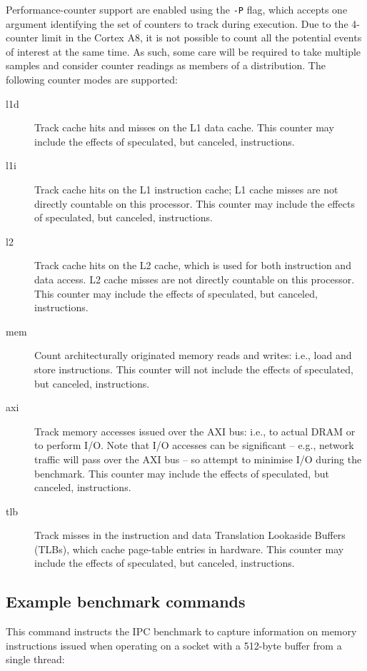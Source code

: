 \documentclass[a4paper,10pt]{article}
\begin{document}
Performance-counter support are enabled using the \texttt{-P} flag, which
accepts one argument identifying the set of counters to track during
execution.
Due to the 4-counter limit in the Cortex A8, it is not possible to count all
the potential events of interest at the same time.
As such, some care will be required to take multiple samples and consider
counter readings as members of a distribution.
The following counter modes are supported:

\begin{description}
\item[l1d] Track cache hits and misses on the L1 data cache.
  This counter may include the effects of speculated, but canceled,
  instructions.
\item[l1i] Track cache hits on the L1 instruction cache; L1 cache misses are
  not directly countable on this processor.
  This counter may include the effects of speculated, but canceled,
  instructions.
\item[l2] Track cache hits on the L2 cache, which is used for both
  instruction and data access.
  L2 cache misses are not directly countable on this processor.
  This counter may include the effects of speculated, but canceled,
  instructions.
\item[mem] Count architecturally originated memory reads and writes: i.e.,
  load and store instructions.
  This counter will not include the effects of speculated, but canceled,
  instructions.
\item[axi] Track memory accesses issued over the AXI bus: i.e., to actual
  DRAM or to perform I/O.
  Note that I/O accesses can be significant -- e.g., network traffic will pass
  over the AXI bus -- so attempt to minimise I/O during the benchmark.
  This counter may include the effects of speculated, but canceled,
  instructions.
\item[tlb] Track misses in the instruction and data Translation Lookaside
  Buffers (TLBs), which cache page-table entries in hardware.
  This counter may include the effects of speculated, but canceled,
  instructions.
\end{description}

\subsection*{Example benchmark commands}

This command instructs the IPC benchmark to capture information on memory
instructions issued when operating on a socket with a 512-byte buffer from a
single thread:
\end{document}
